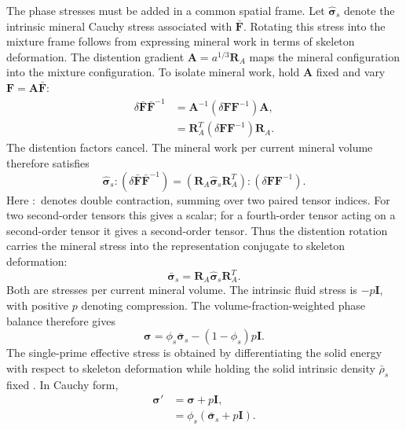 \documentclass[11pt]{article}
\begin{document}
The phase stresses must be added in a common spatial frame. Let
\(\widehat{\mathbf\sigma}_s\) denote the intrinsic mineral Cauchy stress
associated with \(\bar{\mathbf F}\). Rotating this stress into the mixture
frame follows from expressing mineral work in terms of skeleton deformation.
The distention gradient \(\mathbf A=a^{1/3}\mathbf R_A\) maps the mineral
configuration into the mixture configuration. To isolate mineral work,
hold \(\mathbf A\) fixed and vary \(\mathbf F=\mathbf A\bar{\mathbf F}\):
\begin{align}
 \delta\bar{\mathbf F}\bar{\mathbf F}^{-1}
 &=\mathbf A^{-1}(\delta\mathbf F\mathbf F^{-1})\mathbf A,
 \label{eq:fixed-distention-mineral-increment}\\
 &=\mathbf R_A^T(\delta\mathbf F\mathbf F^{-1})\mathbf R_A.
 \label{eq:fixed-distention-rotated-increment}
\end{align}
The distention factors cancel. The mineral work per current mineral volume
therefore satisfies
\begin{equation}
 \widehat{\mathbf\sigma}_s:
       (\delta\bar{\mathbf F}\bar{\mathbf F}^{-1})
 =\left(\mathbf R_A\widehat{\mathbf\sigma}_s\mathbf R_A^T\right):
       (\delta\mathbf F\mathbf F^{-1}).
 \label{eq:mineral-cauchy-work-rotation}
\end{equation}
Here \(:\) denotes double contraction, summing over two paired tensor
indices. For two second-order tensors this gives a scalar; for a
fourth-order tensor acting on a second-order tensor it gives a second-order
tensor.
Thus the distention rotation carries the mineral stress into the
representation conjugate to skeleton deformation:
\begin{equation}
 \bar{\mathbf\sigma}_s
 =\mathbf R_A\widehat{\mathbf\sigma}_s\mathbf R_A^T.
 \label{eq:rotated-mineral-cauchy}
\end{equation}
Both are stresses per current mineral volume. The intrinsic fluid stress is
\(-p\mathbf I\), with positive \(p\) denoting compression. The
volume-fraction-weighted phase balance therefore gives
\begin{equation}
 \mathbf\sigma
 =\phi_s\bar{\mathbf\sigma}_s-(1-\phi_s)p\mathbf I.
 \label{eq:constitutive-phase-stress-sum}
\end{equation}
The single-prime effective stress is obtained by differentiating the solid
energy with respect to skeleton deformation while holding the solid intrinsic
density \(\bar\rho_s\) fixed \citep{fosterxu2025}. In Cauchy form,
\begin{align}
 \mathbf\sigma'&=\mathbf\sigma+p\mathbf I,
 \label{eq:total-cauchy-single-prime}\\
 &=\phi_s(\bar{\mathbf\sigma}_s+p\mathbf I).
 \label{eq:constitutive-single-prime-phase-stress}
\end{align}
\end{document}
